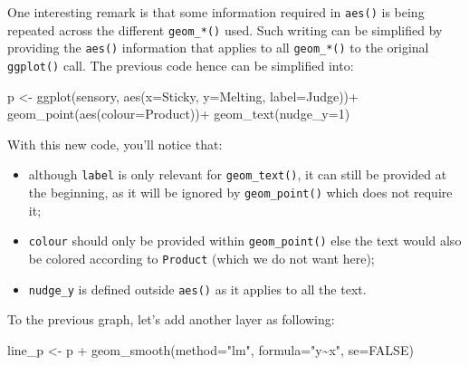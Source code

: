 \documentclass[
]{book}
\newenvironment{Shaded}{\begin{snugshade}}{\end{snugshade}}
\newcommand{\AttributeTok}[1]{\textcolor[rgb]{0.77,0.63,0.00}{#1}}
\newcommand{\ConstantTok}[1]{\textcolor[rgb]{0.00,0.00,0.00}{#1}}
\newcommand{\DecValTok}[1]{\textcolor[rgb]{0.00,0.00,0.81}{#1}}
\newcommand{\FunctionTok}[1]{\textcolor[rgb]{0.00,0.00,0.00}{#1}}
\newcommand{\NormalTok}[1]{#1}
\newcommand{\OtherTok}[1]{\textcolor[rgb]{0.56,0.35,0.01}{#1}}
\newcommand{\SpecialCharTok}[1]{\textcolor[rgb]{0.00,0.00,0.00}{#1}}
\newcommand{\StringTok}[1]{\textcolor[rgb]{0.31,0.60,0.02}{#1}}
\providecommand{\tightlist}{%
  \setlength{\itemsep}{0pt}\setlength{\parskip}{0pt}}
\begin{document}
One interesting remark is that some information required in \texttt{aes()} is being repeated across the different \texttt{geom\_*()} used. Such writing can be simplified by providing the \texttt{aes()} information that applies to all \texttt{geom\_*()} to the original \texttt{ggplot()} call. The previous code hence can be simplified into:

\begin{Shaded}
\begin{Highlighting}[]
\NormalTok{p }\OtherTok{\textless{}{-}} \FunctionTok{ggplot}\NormalTok{(sensory, }\FunctionTok{aes}\NormalTok{(}\AttributeTok{x=}\NormalTok{Sticky, }\AttributeTok{y=}\NormalTok{Melting, }\AttributeTok{label=}\NormalTok{Judge))}\SpecialCharTok{+}
  \FunctionTok{geom\_point}\NormalTok{(}\FunctionTok{aes}\NormalTok{(}\AttributeTok{colour=}\NormalTok{Product))}\SpecialCharTok{+}
  \FunctionTok{geom\_text}\NormalTok{(}\AttributeTok{nudge\_y=}\DecValTok{1}\NormalTok{)}
\end{Highlighting}
\end{Shaded}

With this new code, you'll notice that:

\begin{itemize}
\tightlist
\item
  although \texttt{label} is only relevant for \texttt{geom\_text()}, it can still be provided at the beginning, as it will be ignored by \texttt{geom\_point()} which does not require it;
\item
  \texttt{colour} should only be provided within \texttt{geom\_point()} else the text would also be colored according to \texttt{Product} (which we do not want here);
\item
  \texttt{nudge\_y} is defined outside \texttt{aes()} as it applies to all the text.
\end{itemize}

To the previous graph, let's add another layer as following:

\begin{Shaded}
\begin{Highlighting}[]
\NormalTok{line\_p }\OtherTok{\textless{}{-}}\NormalTok{ p }\SpecialCharTok{+} \FunctionTok{geom\_smooth}\NormalTok{(}\AttributeTok{method=}\StringTok{"lm"}\NormalTok{, }\AttributeTok{formula=}\StringTok{"y\textasciitilde{}x"}\NormalTok{, }\AttributeTok{se=}\ConstantTok{FALSE}\NormalTok{)}
\end{Highlighting}
\end{Shaded}
\end{document}
